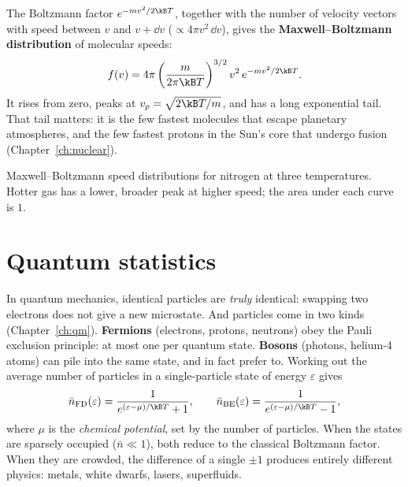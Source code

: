 The Boltzmann factor $e^{-mv^2/2\kB T}$, together with the number of velocity vectors with speed between $v$ and $v + \dd v$ ($\propto 4\pi v^2\,\dd v$), gives the \textbf{Maxwell--Boltzmann distribution} of molecular speeds:
\[
  f(v) = 4\pi\left(\frac{m}{2\pi\kB T}\right)^{3/2} v^2\,e^{-mv^2/2\kB T}.
\]
It rises from zero, peaks at $v_p = \sqrt{2\kB T/m}$, and has a long exponential tail. That tail matters: it is the few fastest molecules that escape planetary atmospheres, and the few fastest protons in the Sun's core that undergo fusion (Chapter~\ref{ch:nuclear}).

\begin{center}
\begin{minipage}{\linewidth}\centering
{}

{\small Maxwell--Boltzmann speed distributions for nitrogen at three temperatures. Hotter gas has a lower, broader peak at higher speed; the area under each curve is $1$.}
\end{minipage}
\end{center}

\section{Quantum statistics}

In quantum mechanics, identical particles are \emph{truly} identical: swapping two electrons does not give a new microstate. And particles come in two kinds (Chapter~\ref{ch:qm}). \textbf{Fermions} (electrons, protons, neutrons) obey the Pauli exclusion principle: at most one per quantum state. \textbf{Bosons} (photons, helium-4 atoms) can pile into the same state, and in fact prefer to. Working out the average number of particles in a single-particle state of energy $\varepsilon$ gives
\[
  \bar n_{\text{FD}}(\varepsilon) = \frac{1}{e^{(\varepsilon-\mu)/\kB T}+1}, \qquad
  \bar n_{\text{BE}}(\varepsilon) = \frac{1}{e^{(\varepsilon-\mu)/\kB T}-1},
\]
where $\mu$ is the \emph{chemical potential}, set by the number of particles. When the states are sparsely occupied ($\bar n\ll1$), both reduce to the classical Boltzmann factor. When they are crowded, the difference of a single $\pm1$ produces entirely different physics: metals, white dwarfs, lasers, superfluids.

